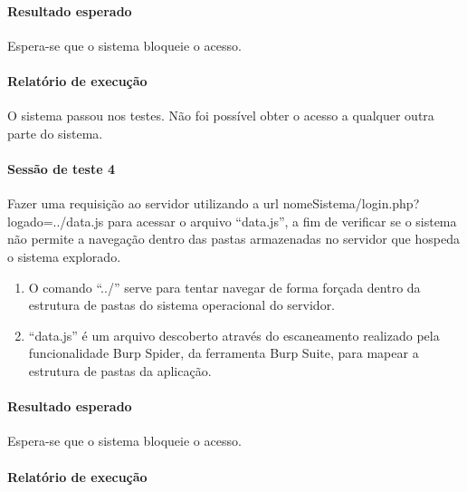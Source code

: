 \documentclass[
    12pt,               %
    openright,          %
    oneside,            %
    a4paper,            %
    section=TITLE,     %
    english,            %
    french,             %
    spanish,            %
    brazil              %
    ]{abntex2}
\begin{document}
\paragraph*{Resultado esperado}

Espera-se que o sistema bloqueie o acesso.



\paragraph*{Relatório de execução}

O sistema passou nos testes. Não foi possível obter o acesso a qualquer outra parte do sistema.



\paragraph*{Sessão de teste 4}

Fazer uma requisição ao servidor utilizando a url nomeSistema/login.php?logado=../data.js para acessar o arquivo \textquotedblleft{}data.js\textquotedblright{}, a fim de verificar se o sistema não permite a navegação dentro das pastas armazenadas no servidor que hospeda o sistema explorado.



\begin{enumerate}[start=1]
	
\item 
	O comando \textquotedblleft{}../\textquotedblright{} serve para tentar navegar de forma forçada dentro da estrutura de pastas do sistema operacional do servidor.

	
	
\item 
	\textquotedblleft{}data.js\textquotedblright{} é um arquivo descoberto através do escaneamento realizado pela funcionalidade Burp Spider, da ferramenta Burp Suite, para mapear a estrutura de pastas da aplicação.

	

\end{enumerate}


\paragraph*{Resultado esperado}

Espera-se que o sistema bloqueie o acesso.



\paragraph*{Relatório de execução}
\end{document}
